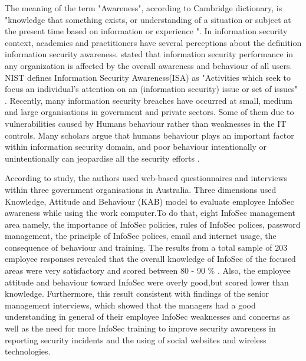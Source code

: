 The meaning of the term "Awareness", according to Cambridge dictionary, is "knowledge that something exists, or understanding of a situation or subject at the present time based on information or experience ".
In information security context, academics and practitioners have several perceptions about the definition information security awareness. \citet{Albrechtsen} stated that information security performance in any organization is affected by the overall awareness and behaviour of all users.   
NIST\cite{Kissel2013} defines Information Security Awareness(ISA) as "Activities which seek to focus an individual’s attention on an (information security) issue or set of issues" .  
Recently, many information security breaches have occurred at small, medium and large organisations in government and private sectors. Some of them due to vulnerabilities caused by Humans behaviour rather than  weaknesses in the IT controls. Many scholars argue that humans behaviour plays an important factor within information security domain, and poor behaviour intentionally or unintentionally can jeopardise all the security efforts \cite{Kruger2006,Butavicius2017,Bawazir2016,Giraldo2014,Lebek2013,McCormac2016,Safa2015,Benbasat2010a}.  

According to \citet{Parsons2013} study, the authors used web-based questionnaires and interviews within three government organisations in Australia. Three dimensions used Knowledge, Attitude and Behaviour (KAB) model to evaluate employee InfoSec awareness while using the work computer.To do that, eight InfoSec management area namely, the importance of InfoSec policies, rules of InfoSec polices, password management, the principle of InfoSec polices, email and internet usage, the consequence of behaviour and training. The results from a total sample of 203 employee responses revealed that the overall knowledge of InfoSec of the focused areas were very satisfactory and scored between 80 - 90 \% . Also, the employee attitude and behaviour toward InfoSec were overly good,but scored lower than knowledge. Furthermore, this result consistent with findings of the senior management interviews, which showed that the managers had a good understanding in general of their employee InfoSec weaknesses and concerns as well as the need for more InfoSec training to improve security awareness in reporting security incidents and the using of social websites and wireless technologies.
 

